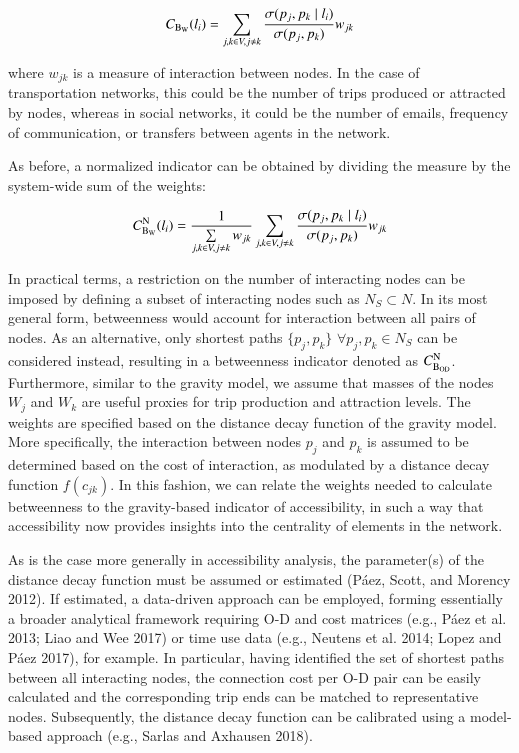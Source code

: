 \documentclass[]{elsarticle} %
\begin{document}
\begin{equation}\label{f:btw_weight}
C_{\rm B_W}(l_i)=\sum\limits_{j,k \space \in V,j\neq k} \frac{{\sigma(p_j,p_k \mid l_i)}}{\sigma(p_j,p_k)}w_{jk}
\end{equation}

\noindent where \(w_{jk}\) is a measure of interaction between nodes. In
the case of transportation networks, this could be the number of trips
produced or attracted by nodes, whereas in social networks, it could be
the number of emails, frequency of communication, or transfers between
agents in the network.

As before, a normalized indicator can be obtained by dividing the
measure by the system-wide sum of the weights:

\begin{equation}\label{f:btw_weight_norm}
C_{\rm B_W}^{\rm N}(l_i)= \frac{1}{\sum\limits_{j,k \space \in V,j\neq k} w_{jk}}\sum\limits_{j,k \space \in V,j\neq k} \frac{{\sigma(p_j,p_k \mid l_i)}}{\sigma(p_j,p_k)}w_{jk}
\end{equation}

In practical terms, a restriction on the number of interacting nodes can
be imposed by defining a subset of interacting nodes such as
\(N_{S} \subset N\). In its most general form, betweenness would account
for interaction between all pairs of nodes. As an alternative, only
shortest paths \(\{p_j,p_k\}\) \(\forall p_j,p_k \in N_{S}\) can be
considered instead, resulting in a betweenness indicator denoted as
\(C_{\rm B_{OD}}^{\rm N}\). Furthermore, similar to the gravity model,
we assume that masses of the nodes \(W_j\) and \(W_k\) are useful
proxies for trip production and attraction levels. The weights are
specified based on the distance decay function of the gravity model.
More specifically, the interaction between nodes \(p_j\) and \(p_k\) is
assumed to be determined based on the cost of interaction, as modulated
by a distance decay function \(f(c_{jk})\). In this fashion, we can
relate the weights needed to calculate betweenness to the gravity-based
indicator of accessibility, in such a way that accessibility now
provides insights into the centrality of elements in the network.

As is the case more generally in accessibility analysis, the
parameter(s) of the distance decay function must be assumed or estimated
(Páez, Scott, and Morency 2012). If estimated, a data-driven approach
can be employed, forming essentially a broader analytical framework
requiring O-D and cost matrices (e.g., Páez et al. 2013; Liao and Wee
2017) or time use data (e.g., Neutens et al. 2014; Lopez and Páez 2017),
for example. In particular, having identified the set of shortest paths
between all interacting nodes, the connection cost per O-D pair can be
easily calculated and the corresponding trip ends can be matched to
representative nodes. Subsequently, the distance decay function can be
calibrated using a model-based approach (e.g., Sarlas and Axhausen
2018).
\end{document}
